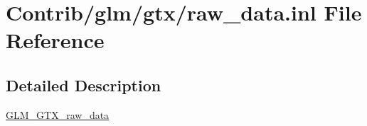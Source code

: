 \hypertarget{raw__data_8inl}{}\section{Contrib/glm/gtx/raw\+\_\+data.inl File Reference}
\label{raw__data_8inl}


\subsection{Detailed Description}
\mbox{\hyperlink{group__gtx__raw__data}{G\+L\+M\+\_\+\+G\+T\+X\+\_\+raw\+\_\+data}} 